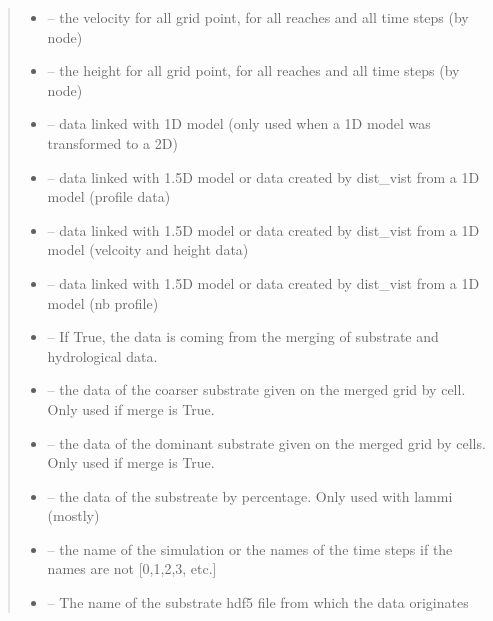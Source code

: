 \documentclass[letterpaper,10pt,english]{sphinxmanual}
\begin{document}
\begin{fulllineitems}
\begin{quote}
\begin{description}
\begin{itemize}
\item {} 
 -- the velocity for all grid point, for all reaches and all time steps (by node)

\item {} 
 -- the height for all grid point, for all reaches and all time steps (by node)

\item {} 
 -- data linked with 1D model (only used when a 1D model was transformed to a 2D)

\item {} 
 -- data linked with 1.5D model or data created by dist\_vist from a 1D model (profile data)

\item {} 
 -- data linked with 1.5D model or data created by dist\_vist from a 1D model (velcoity and height data)

\item {} 
 -- data linked with 1.5D model or data created by dist\_vist from a 1D model (nb profile)

\item {} 
 -- If True, the data is coming from the merging of substrate and hydrological data.

\item {} 
 -- the data of the coarser substrate given on the merged grid by cell. Only used if merge is True.

\item {} 
 -- the data of the dominant substrate given on the merged grid by cells. Only used if merge is True.

\item {} 
 -- the data of the substreate by percentage. Only used with lammi (mostly)

\item {} 
 -- the name of the simulation or the names of the time steps if the names are not {[}0,1,2,3, etc.{]}

\item {} 
 -- The name of the substrate hdf5 file from which the data originates


\end{itemize}
\end{description}
\end{quote}
\end{fulllineitems}
\end{document}
